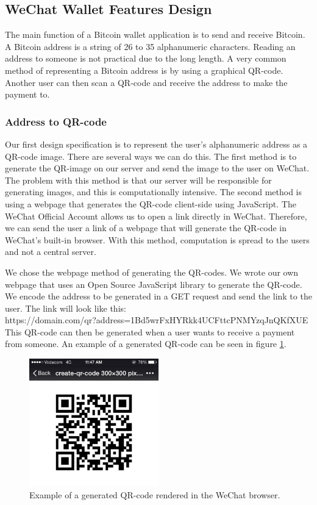 \subsection{WeChat Wallet Features Design}

The main function of a Bitcoin wallet application is to send and receive Bitcoin. A Bitcoin address is a string of 26 to 35 alphanumeric characters. Reading an address to someone is not practical due to the long length. A very common method of representing a Bitcoin address is by using a graphical QR-code. Another user can then scan a QR-code and receive the address to make the payment to.

\subsubsection{Address to QR-code}
Our first design specification is to represent the user's alphanumeric address as a QR-code image. There are several ways we can do this. The first method is to generate the QR-image on our server and send the image to the user on WeChat. The problem with this method is that our server will be responsible for generating images, and this is computationally intensive. The second method is using a webpage that generates the QR-code client-side using JavaScript. The WeChat Official Account allows us to open a link directly in WeChat. Therefore, we can send the user a link of a webpage that will generate the QR-code in WeChat's built-in browser. With this method, computation is spread to the users and not a central server. 

We chose the webpage method of generating the QR-codes. We wrote our own webpage that uses an Open Source JavaScript library to generate the QR-code. We encode the address to be generated in a GET request and send the link to the user. The link will look like this: \\https://domain.com/qr?address=1Bd5wrFxHYRkk4UCFttcPNMYzqJnQKfXUE\\This QR-code can then be generated when a user wants to receive a payment from someone. An example of a generated QR-code can be seen in figure \ref{fig:qr_code}.

\begin{figure}
  \centering
    \includegraphics[width=0.5\textwidth]{figs/qr_code.jpg}
   \caption{Example of a generated QR-code rendered in the WeChat browser.} 
   \label{fig:qr_code}
\end{figure}

